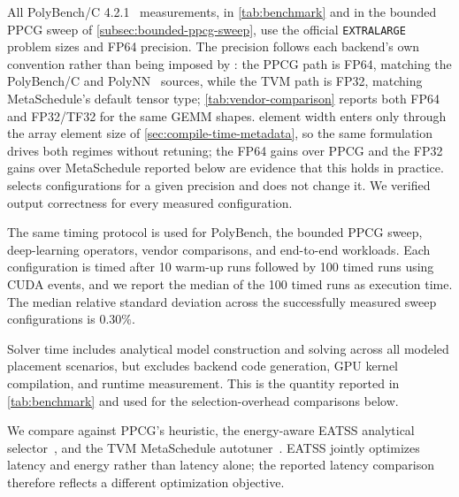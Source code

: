 All PolyBench/C 4.2.1~\cite{polybench} measurements, in \autoref{tab:benchmark} and in the bounded PPCG sweep of \autoref{subsec:bounded-ppcg-sweep}, use the official \texttt{EXTRALARGE} problem sizes and FP64 precision. The precision follows each backend's own convention rather than being imposed by \name: the PPCG path is FP64, matching the PolyBench/C and PolyNN~\cite{polynn} sources, while the TVM path is FP32, matching MetaSchedule's default tensor type; \autoref{tab:vendor-comparison} reports both FP64 and FP32/TF32 for the same GEMM shapes.  element width enters only through the array element size of \autoref{sec:compile-time-metadata}, so the same formulation drives both regimes without retuning; the FP64 gains over PPCG and the FP32 gains over MetaSchedule reported below are evidence that this holds in practice. \name selects configurations for a given precision and does not change it. We verified output correctness for every measured configuration.

The same timing protocol is used for PolyBench, the bounded PPCG sweep, deep-learning operators, vendor comparisons, and end-to-end workloads. Each configuration is timed after 10 warm-up runs followed by 100 timed runs using CUDA events, and we report the median of the 100 timed runs as execution time. The median relative standard deviation across the successfully measured sweep configurations is \(0.30\%\).

Solver time includes analytical model construction and solving across all modeled placement scenarios, but excludes backend code generation, GPU kernel compilation, and runtime measurement. This is the quantity reported in \autoref{tab:benchmark} and used for the selection-overhead comparisons below.

We compare against PPCG's heuristic, the energy-aware EATSS analytical selector~\cite{eatss}, and the TVM MetaSchedule autotuner~\cite{metaschedule}. EATSS jointly optimizes latency and energy rather than latency alone; the reported latency comparison therefore reflects a different optimization objective. 

